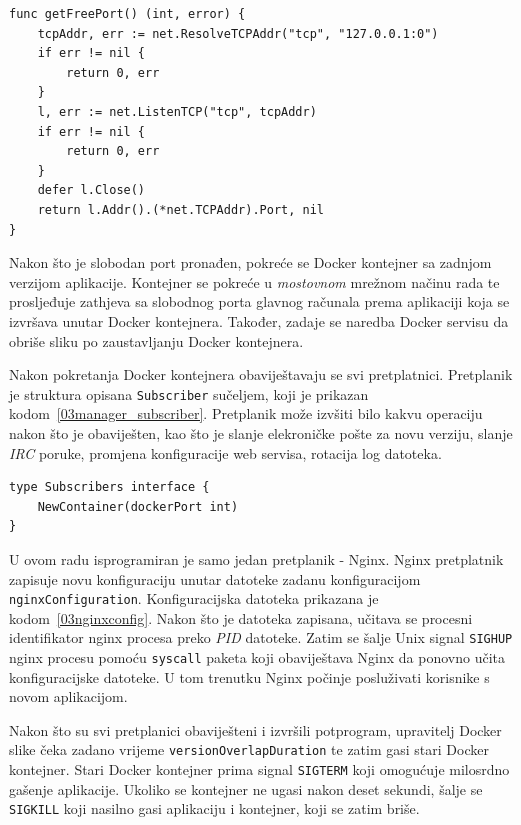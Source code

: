 \begin{lstlisting}[float=h]
func getFreePort() (int, error) {
	tcpAddr, err := net.ResolveTCPAddr("tcp", "127.0.0.1:0")
	if err != nil {
		return 0, err
	}
	l, err := net.ListenTCP("tcp", tcpAddr)
	if err != nil {
		return 0, err
	}
	defer l.Close()
	return l.Addr().(*net.TCPAddr).Port, nil
}
\end{lstlisting}

Nakon što je slobodan port pronađen, pokreće se Docker kontejner sa zadnjom verzijom aplikacije.
Kontejner se pokreće u \textit{mostovnom} mrežnom načinu rada te prosljeđuje zathjeva sa slobodnog
porta glavnog računala prema aplikaciji koja se izvršava unutar Docker kontejnera. Također, zadaje
se naredba Docker servisu da obriše sliku po zaustavljanju Docker kontejnera.

Nakon pokretanja Docker kontejnera obaviještavaju se svi pretplatnici. Pretplanik je struktura
opisana \texttt{Subscriber} sučeljem, koji je prikazan kodom~\ref{03manager_subscriber}. Pretplanik
može izvšiti bilo kakvu operaciju nakon što je obaviješten, kao što je slanje elekroničke pošte za
novu verziju, slanje \textit{IRC} poruke, promjena konfiguracije web servisa, rotacija log datoteka.

\begin{lstlisting}[float=h]
type Subscribers interface {
	NewContainer(dockerPort int)
}
\end{lstlisting}

U ovom radu isprogramiran je samo jedan pretplanik - Nginx. Nginx pretplatnik zapisuje novu
konfiguraciju unutar datoteke zadanu konfiguracijom \texttt{nginxConfiguration}. Konfiguracijska
datoteka prikazana je kodom~\ref{03nginxconfig}. Nakon što je datoteka zapisana, učitava se procesni
identifikator nginx procesa preko \textit{PID} datoteke. Zatim se šalje Unix signal \texttt{SIGHUP}
nginx procesu pomoću \texttt{syscall} paketa koji obaviještava Nginx da ponovno učita konfiguracijske
datoteke. U tom trenutku Nginx počinje posluživati korisnike s novom aplikacijom.

Nakon što su svi pretplanici obaviješteni i izvršili potprogram, upravitelj Docker slike čeka zadano
vrijeme \texttt{versionOverlapDuration} te zatim gasi stari Docker kontejner. Stari Docker kontejner
prima signal \texttt{SIGTERM} koji omogućuje milosrdno gašenje aplikacije. Ukoliko se kontejner ne
ugasi nakon deset sekundi, šalje se \texttt{SIGKILL} koji nasilno gasi aplikaciju i kontejner, koji
se zatim briše.

